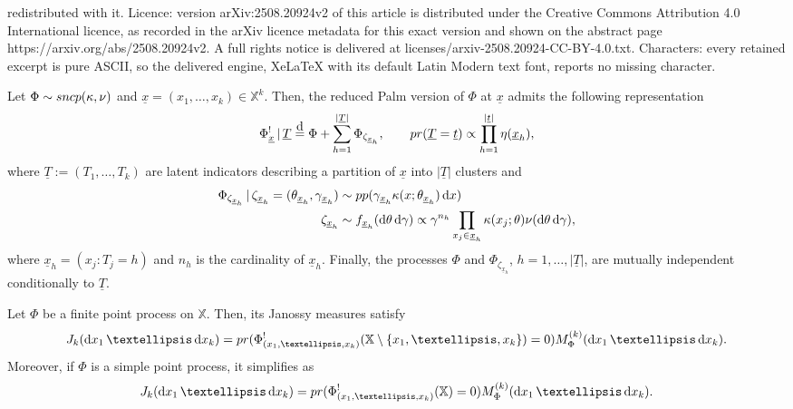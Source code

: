 \documentclass[10pt,a4paper]{amsart}
\newcommand{\X}{\mathbb{X}}
\newcommand{\dd}{\mathrm d}
\newcommand{\deq}{\stackrel{\mbox{\scriptsize d}}{=}}
\newcommand{\prob}{{\rm pr}}
\renewcommand{\mid}{\ensuremath{\,|\,}}
\begin{document}
redistributed with it. Licence: version arXiv:2508.20924v2 of this article is distributed under the Creative Commons Attribution 4.0 International licence, as recorded in the arXiv licence metadata for this exact version and shown on the abstract page https://arxiv.org/abs/2508.20924v2. A full rights notice is delivered at licenses/arxiv-2508.20924-CC-BY-4.0.txt. Characters: every retained excerpt is pure ASCII, so the delivered engine, XeLaTeX with its default Latin Modern text font, reports no missing character.
\begin{theorem}\label{thm:red_palm_sncp} 
Let $\Phi \sim \textsc{sncp}(\kappa, \nu)$ and $\underline{x} = (x_1, \ldots, x_k) \in \X^k$. Then, the reduced Palm version of $\Phi$ at $\underline{x}$ admits the following representation
\begin{equation}\label{eq:thesis_palm_sncp}
    \Phi^!_{\underline{x}}\mid \underline{T} \deq \Phi + \sum_{h = 1}^{|\underline{T}|} \Phi_{\zeta_{{\underline{x}}_h}},\qquad \prob(\underline{T} = \underline{t}) \propto \prod_{h=1}^{|\underline{t}|} \eta(\underline{x}_h),
\end{equation}
where $\underline{T} := (T_1,\ldots,T_k)$ are latent indicators describing a partition of $\underline{x}$ into $|\underline{T}|$ clusters and
\begin{equation*}
    \begin{aligned}
        \Phi_{\zeta_{{\underline{x}}_h}} \mid \zeta_{{\underline{x}}_h} = (\theta_{{\underline{x}}_h}, \gamma_{{\underline{x}}_h}) &\sim \textsc{pp}(\gamma_{{\underline{x}}_h} \kappa(x; \theta_{{\underline{x}}_h}) \,\dd x)\\
        \zeta_{{\underline{x}}_h}  &\sim f_{{\underline{x}}_h}(\dd \theta\, \dd \gamma) \propto \gamma^{n_h} \prod_{x_j \in 
        \underline{x}_h}\kappa(x_j;\theta) \nu(\dd \theta\, \dd \gamma),
    \end{aligned}
\end{equation*}
where $\underline{x}_h = (x_j: T_j = h)$ and $n_h$ is the cardinality of $\underline{x}_h$.
Finally, the processes $\Phi$ and $\Phi_{\zeta_{{\underline{x}}_h}}$, $h = 1,\ldots, |\underline{T}|$, are mutually independent conditionally to $\underline{T}$.
\end{theorem}

\begin{theorem}\label{thm:janossy_general}
Let $\Phi$ be a finite point process on $\X$. Then, its Janossy measures satisfy
\[
J_k(\dd x_1\,\ldots\, \dd x_k) = \prob(\Phi^!_{(x_1,\ldots,x_k)}(\X\setminus \{x_1,\ldots,x_k\} ) = 0)  M^{(k)}_{\Phi}(\dd x_1\,\ldots\, \dd x_k).
\]
Moreover, if $\Phi$ is a simple point process, it simplifies as
\[
J_k(\dd x_1\,\ldots\, \dd x_k) = \prob(\Phi^!_{(x_1,\ldots,x_k)}(\X) = 0)  M^{(k)}_{\Phi}(\dd x_1\,\ldots\, \dd x_k).
\]
\end{theorem}
\end{document}
